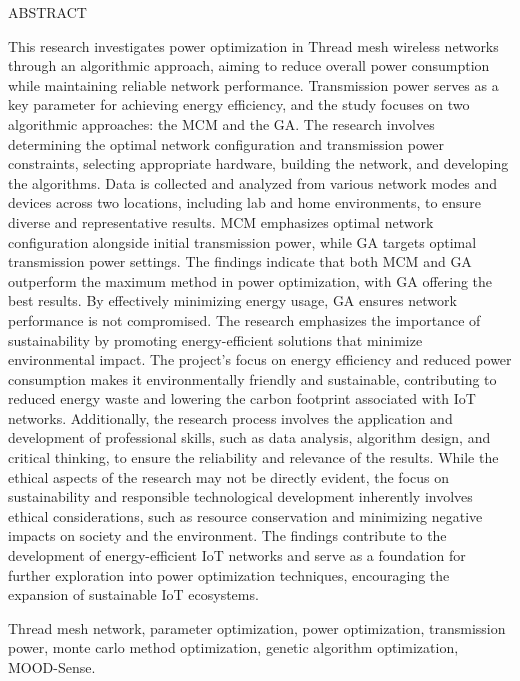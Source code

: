 \begin{center}
    ABSTRACT
\vspace{5mm}
\end{center}

This research investigates power optimization in Thread mesh wireless networks through an algorithmic approach, aiming to reduce overall power consumption while maintaining reliable network performance. Transmission power serves as a key parameter for achieving energy efficiency, and the study focuses on two algorithmic approaches: the \gls{MCM} and the \gls{GA}. The research involves determining the optimal network configuration and transmission power constraints, selecting appropriate hardware, building the network, and developing the algorithms. Data is collected and analyzed from various network modes and devices across two locations, including lab and home environments, to ensure diverse and representative results. \gls{MCM} emphasizes optimal network configuration alongside initial transmission power, while \gls{GA} targets optimal transmission power settings. The findings indicate that both \gls{MCM} and \gls{GA} outperform the maximum method in power optimization, with \gls{GA} offering the best results. By effectively minimizing energy usage, \gls{GA} ensures network performance is not compromised. The research emphasizes the importance of sustainability by promoting energy-efficient solutions that minimize environmental impact. The project's focus on energy efficiency and reduced power consumption makes it environmentally friendly and sustainable, contributing to reduced energy waste and lowering the carbon footprint associated with \gls{IoT} networks. Additionally, the research process involves the application and development of professional skills, such as data analysis, algorithm design, and critical thinking, to ensure the reliability and relevance of the results. While the ethical aspects of the research may not be directly evident, the focus on sustainability and responsible technological development inherently involves ethical considerations, such as resource conservation and minimizing negative impacts on society and the environment. The findings contribute to the development of energy-efficient \gls{IoT} networks and serve as a foundation for further exploration into power optimization techniques, encouraging the expansion of sustainable \gls{IoT} ecosystems.

\vspace{5mm}
 Thread mesh network, parameter optimization, power optimization, transmission power, monte carlo method optimization, genetic algorithm optimization, MOOD-Sense.
